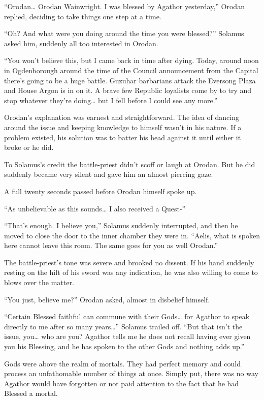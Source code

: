 \documentclass[a4paper,10pt]{book}
\begin{document}
“Orodan… Orodan Wainwright. I was blessed by Agathor yesterday,” Orodan replied, deciding to take things one step at a time.\par
“Oh? And what were you doing around the time you were blessed?” Solamus asked him, suddenly all too interested in Orodan.\par
“You won’t believe this, but I came back in time after dying. Today, around noon in Ogdenborough around the time of the Council announcement from the Capital there’s going to be a huge battle. Guzuhar barbarians attack the Eversong Plaza and House Argon is in on it. A brave few Republic loyalists come by to try and stop whatever they’re doing… but I fell before I could see any more.”\par
Orodan’s explanation was earnest and straightforward. The idea of dancing around the issue and keeping knowledge to himself wasn’t in his nature. If a problem existed, his solution was to batter his head against it until either it broke or he did.\par
To Solamus’s credit the battle-priest didn’t scoff or laugh at Orodan. But he did suddenly became very silent and gave him an almost piercing gaze.\par
A full twenty seconds passed before Orodan himself spoke up.\par
“As unbelievable as this sounds… I also received a Quest-”\par
“That’s enough. I believe you,” Solamus suddenly interrupted, and then he moved to close the door to the inner chamber they were in. “Aelis, what is spoken here cannot leave this room. The same goes for you as well Orodan.”\par
The battle-priest’s tone was severe and brooked no dissent. If his hand suddenly resting on the hilt of his sword was any indication, he was also willing to come to blows over the matter.\par
“You just, believe me?” Orodan asked, almost in disbelief himself.\par
“Certain Blessed faithful can commune with their Gods… for Agathor to speak directly to me after so many years…” Solamus trailed off. “But that isn’t the issue, you… who are you? Agathor tells me he does not recall having ever given you his Blessing, and he has spoken to the other Gods and nothing adds up.”\par
Gods were above the realm of mortals. They had perfect memory and could process an unfathomable number of things at once. Simply put, there was no way Agathor would have forgotten or not paid attention to the fact that he had Blessed a mortal.\par
\end{document}
